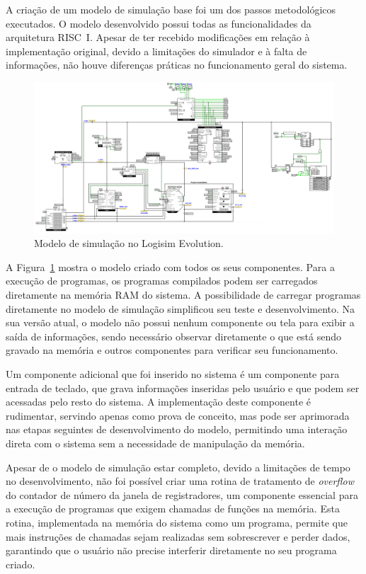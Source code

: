 \documentclass[
	12pt,				%
	openright,			%
	oneside,			%
	a4paper,			%
	english,			%
	french,				%
	spanish,			%
	brazil,				%
	]{abntex2}
\begin{document}
A criação de um modelo de simulação base foi um dos passos metodológicos executados. O modelo desenvolvido possui todas as funcionalidades da arquitetura RISC~I. Apesar de ter recebido modificações em relação à implementação original, devido a limitações do simulador e à falta de informações, não houve diferenças práticas no funcionamento geral do sistema.

\begin{figure}[h]
    \centering
    \includegraphics[width=1\linewidth]{riscInternal.png}
    \caption{Modelo de simulação no Logisim Evolution.}
    \label{fig:simModel}
\end{figure}

A Figura~\ref{fig:simModel} mostra o modelo criado com todos os seus componentes. Para a execução de programas, os programas compilados podem ser carregados diretamente na memória RAM do sistema. A possibilidade de carregar programas diretamente no modelo de simulação simplificou seu teste e desenvolvimento. Na sua versão atual, o modelo não possui nenhum componente ou tela para exibir a saída de informações, sendo necessário observar diretamente o que está sendo gravado na memória e outros componentes para verificar seu funcionamento.

Um componente adicional que foi inserido no sistema é um componente para entrada de teclado, que grava informações inseridas pelo usuário e que podem ser acessadas pelo resto do sistema. A implementação deste componente é rudimentar, servindo apenas como prova de conceito, mas pode ser aprimorada nas etapas seguintes de desenvolvimento do modelo, permitindo uma interação direta com o sistema sem a necessidade de manipulação da memória.

Apesar de o modelo de simulação estar completo, devido a limitações de tempo no desenvolvimento, não foi possível criar uma rotina de tratamento de \textit{overflow} do contador de número da janela de registradores, um componente essencial para a execução de programas que exigem chamadas de funções na memória. Esta rotina, implementada na memória do sistema como um programa, permite que mais instruções de chamadas sejam realizadas sem sobrescrever e perder dados, garantindo que o usuário não precise interferir diretamente no seu programa criado.
\end{document}
